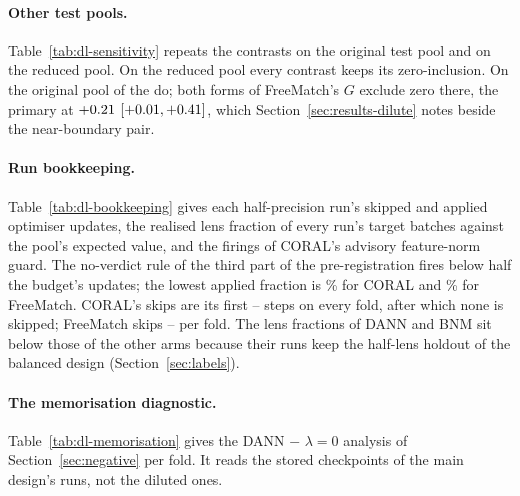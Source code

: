 

\paragraph{Other test pools.} Table~\ref{tab:dl-sensitivity} repeats the \dlNtWord{} contrasts on
the original test pool and on the reduced pool. On the reduced pool every contrast keeps its
zero-inclusion. On the original pool \dlOrigMatchWord{} of the \dlNtWord{} do; both forms of
FreeMatch's $G$ exclude zero there, the primary at $+0.21{}$
$[+0.01{}, +0.41{}]$, which Section~\ref{sec:results-dilute} notes beside the
near-boundary pair.



\paragraph{Run bookkeeping.} Table~\ref{tab:dl-bookkeeping} gives each half-precision run's
skipped and applied optimiser updates, the realised lens fraction of every run's target batches
against the pool's expected value, and the firings of CORAL's advisory feature-norm guard. The
no-verdict rule of the third part of the pre-registration fires below half the budget's updates;
the lowest applied fraction is \dlCoralAppliedPct{}\% for CORAL and \dlFmAppliedPct{}\% for
FreeMatch. CORAL's skips are its first \dlCoralSkipMin{}--\dlCoralSkipMax{} steps on every fold,
after which none is skipped; FreeMatch skips \dlFmSkipMin{}--\dlFmSkipMax{} per fold. The lens
fractions of DANN and BNM sit below those of the other arms because their runs keep the
half-lens holdout of the balanced design (Section~\ref{sec:labels}).



\paragraph{The memorisation diagnostic.} Table~\ref{tab:dl-memorisation} gives the DANN
$-$ $\lambda=0$ analysis of Section~\ref{sec:negative} per fold. It reads the stored
checkpoints of the main design's runs, not the diluted ones.


